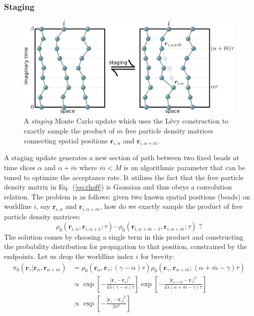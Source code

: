 \documentclass[prb,10pt,aps,floatfix,notitlepage]{revtex4-1}
\renewcommand{\vec}[1]{\boldsymbol{#1}}
\renewcommand{\eqref}[1]{Eq.~(\ref{#1})}
\begin{document}
\subsubsection{Staging}
%
\begin{figure}
\begin{center}
\includegraphics[width=0.75\columnwidth]{Figures/staging.pdf}
\end{center}
\caption{A \emph{staging} Monte Carlo update which uses the L\'{e}vy
construction to exactly sample the product of $\overline{m}$ free particle
density matrices connecting spatial positions $\vec{r}_{i,\alpha}$ and
$\vec{r}_{i,\alpha+\overline{m}}$.}
\label{fig:staging}
 \end{figure}
%
A staging update \cite{Sprik:1985bz} generates a new section of path between
two fixed beads at time slices $\alpha$ and $\alpha+\overline{m}$ where
$\overline{m} < M$ is an algorithmic parameter that can be tuned to optimize
the acceptance rate. It
utilizes the fact that the free particle density matrix in \eqref{eq:rho0} is
Gaussian and thus obeys a convolution relation.  The problem is as follows:
given two known spatial positions (beads) on worldline $i$, say $\vec{r}_{i,\alpha}$
and $\vec{r}_{i,\alpha+\overline{m}}$, how do we exactly sample the product of free particle
density matrices:
%
\begin{equation}
    \rho_0(\vec{r}_{i,\alpha},\vec{r}_{i,\alpha+1};\tau) \cdots
    \rho_0(\vec{r}_{i,\alpha+\overline{m}-1},\vec{r}_{i,\alpha+\overline{m}};\tau)\; ?
\end{equation}
%
The solution comes by choosing a single term in this product and constructing
the probability distribution for propagation to that position, constrained by the
endpoints. Let us drop the worldline index $i$ for brevity:  
%
\begin{align}
    \pi_0(\vec{r}_\gamma| \vec{r}_{\alpha},\vec{r}_{\alpha+\overline{m}}) &=
    \rho_0(\vec{r}_\alpha,\vec{r}_\gamma;(\gamma-\alpha)\tau) 
\rho_0(\vec{r}_\gamma,\vec{r}_{\alpha+\overline{m}};(\alpha+\overline{m}-\gamma)\tau) \nonumber \\
&\propto 
\exp\left[-\frac{|\vec{r}_\gamma-\vec{r}_{\alpha}|^2}{4\lambda (\gamma-\alpha)\tau} \right]
\exp\left[-\frac{|\vec{r}_{\alpha+\overline{m}}-\vec{r}_{\gamma}|^2}{4\lambda
(\alpha+\overline{m}-\gamma)\tau} \right]
\nonumber \\
&\propto \exp\left[-\frac{|\vec{r}_\gamma-\overline{\vec{r}}_{\gamma}|^2}{2 \sigma^2}\right]
\label{eq:pi0}
\end{align}
\end{document}
